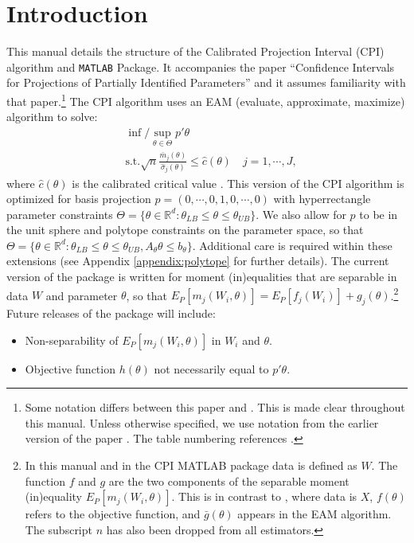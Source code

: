 \documentclass[12pt]{article}
\def\code#1{\texttt{#1}}
\begin{document}
\section{Introduction} \label{sec:introduction}
This manual details the structure of the Calibrated Projection Interval (CPI) algorithm and \code{MATLAB} Package.  It accompanies the paper ``Confidence Intervals for Projections of Partially Identified Parameters'' \cite{kaido2017confidence} and it assumes familiarity with that paper.\footnote{Some notation differs between this paper and \cite{kaido2017confidence}.  This is made clear throughout this manual.  Unless otherwise specified, we use notation from the earlier version of the paper \cite{kaido2016confidence}.  The table numbering references  \cite{kaido2017confidence}.}  The CPI algorithm uses an EAM (evaluate, approximate, maximize) algorithm to solve:
\begin{align*}
& \inf/\sup_{\theta \in \Theta} p'\theta \\
& \text{s.t.} \sqrt{n} \frac{\bar m_{j}(\theta)}{\hat \sigma_{j}(\theta)} \leq \hat c(\theta) \quad j=1,\cdots,J,
\end{align*}
where $\hat c(\theta)$ is the calibrated critical value \cite{jones1998efficient,jones2001taxonomy}.  This version of the CPI algorithm is optimized for basis projection $p = (0,\cdots,0,1,0,\cdots,0)$ with hyperrectangle parameter constraints $\Theta = \{\theta \in \mathbb{R}^d: \theta_{LB} \leq \theta \leq  \theta_{UB}\}$.  We also allow for $p$ to be in the unit sphere and polytope constraints on the parameter space, so that
$\Theta = \{\theta \in \mathbb{R}^d: \theta_{LB} \leq \theta \leq  \theta_{UB}, A_{\theta} \theta \leq b_{\theta}\}$.  Additional care is required within these extensions (see Appendix \ref{appendix:polytope} for further details).   The current version of the package is written for moment (in)equalities that are separable in data $W$ and parameter $\theta$, so that $E_P[m_j(W_i,\theta)] = E_P[f_j(W_i)] + g_j(\theta)$.\footnote{In this manual and in the CPI MATLAB package data is defined as $W$.  The function $f$ and $g$ are the two components of the separable moment (in)equality $E_P[m_j(W_i,\theta)]$.  This is in contrast to , where data is $X$, $f(\theta)$ refers to the objective function, and $\bar g(\theta)$ appears in the EAM algorithm.  The subscript $n$ has also been dropped from all estimators.} Future releases of the package will include:
\begin{itemize}
\item Non-separability of $E_P[m_j(W_i,\theta)]$ in $W_i$ and $\theta$.
\item Objective function $h(\theta)$ not necessarily equal to $p'\theta$.
\end{itemize}
\end{document}

